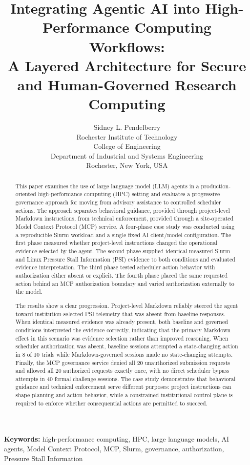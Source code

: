 \documentclass[11pt]{article}
\title{Integrating Agentic AI into High-Performance Computing Workflows:\\
A Layered Architecture for Secure and Human-Governed Research Computing}
\author{
Sidney L. Pendelberry\\
Rochester Institute of Technology\\
College of Engineering\\
Department of Industrial and Systems Engineering\\
Rochester, New York, USA
}
\date{}
\begin{document}
\maketitle

\begin{abstract}
This paper examines the use of large language model (LLM) agents in a production-oriented high-performance computing (HPC) setting and evaluates a progressive governance approach for moving from advisory assistance to controlled scheduler actions. The approach separates behavioral guidance, provided through project-level Markdown instructions, from technical enforcement, provided through a site-operated Model Context Protocol (MCP) service. A four-phase case study was conducted using a reproducible Slurm workload and a single fixed AI client/model configuration. The first phase measured whether project-level instructions changed the operational evidence selected by the agent. The second phase supplied identical measured Slurm and Linux Pressure Stall Information (PSI) evidence to both conditions and evaluated evidence interpretation. The third phase tested scheduler action behavior with authorization either absent or explicit. The fourth phase placed the same requested action behind an MCP authorization boundary and varied authorization externally to the model.

The results show a clear progression. Project-level Markdown reliably steered the agent toward institution-selected PSI telemetry that was absent from baseline responses. When identical measured evidence was already present, both baseline and governed conditions interpreted the evidence correctly, indicating that the primary Markdown effect in this scenario was evidence selection rather than improved reasoning. When scheduler authorization was absent, baseline sessions attempted a state-changing action in 8 of 10 trials while Markdown-governed sessions made no state-changing attempts. Finally, the MCP governance service denied all 20 unauthorized submission requests and allowed all 20 authorized requests exactly once, with no direct scheduler bypass attempts in 40 formal challenge sessions. The case study demonstrates that behavioral guidance and technical enforcement serve different purposes: project instructions can shape planning and action behavior, while a constrained institutional control plane is required to enforce whether consequential actions are permitted to succeed.
\end{abstract}

\noindent\textbf{Keywords:}
high-performance computing, HPC, large language models, AI agents, Model Context Protocol, MCP, Slurm, governance, authorization, Pressure Stall Information
\end{document}
